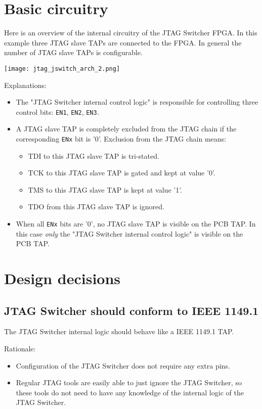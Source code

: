 \documentclass[10pt,english,a4paper]{report}
\begin{document}
\section{Basic circuitry}
Here is an overview of the internal circuitry of the JTAG Switcher FPGA.
In this example three JTAG slave TAPs are connected to the FPGA.
In general the number of JTAG slave TAPs is configurable.
\begin{center}
	\texttt{[image: jtag\_jswitch\_arch\_2.png]}
\end{center}
Explanations:
\begin{itemize}
\item The "JTAG Switcher internal control logic" is responsible for controlling
three control bits: {\tt EN1}, {\tt EN2}, {\tt EN3}.
\item A JTAG slave TAP is completely excluded from the JTAG chain
if the corresponding {\tt ENx} bit is '0'. Exclusion from the JTAG chain means:
\begin{itemize}
\item TDI to this JTAG slave TAP is tri-stated.
\item TCK to this JTAG slave TAP is gated and kept at value '0'.
\item TMS to this JTAG slave TAP is kept at value '1'.
\item TDO from this JTAG slave TAP is ignored.
\end{itemize}
\item When all {\tt ENx} bits are '0', no JTAG slave TAP is visible on the PCB TAP.
In this case {\em only} the "JTAG Switcher internal control logic" is visible
on the PCB TAP.
\end{itemize}

\newpage
\section{Design decisions}
\subsection{JTAG Switcher should conform to IEEE 1149.1}
The JTAG Switcher internal logic should behave like a IEEE 1149.1 TAP.

Rationale:
\begin{itemize}
\item Configuration of the JTAG Switcher does not require any extra pins.
\item Regular JTAG tools are easily able to just ignore the JTAG Switcher, so
these tools do not need to have any knowledge of the internal logic of the JTAG Switcher.
\end{itemize}
\end{document}
